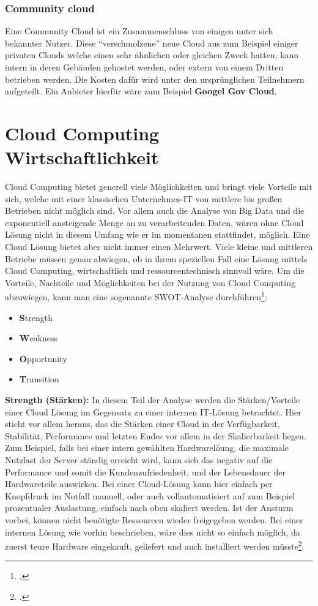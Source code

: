\subsubsection{Community cloud}
Eine Community Cloud ist ein Zusammenschluss von einigen unter sich bekannter Nutzer. Diese "`verschmolzene"' neue Cloud aus zum Beispiel einiger privaten Clouds welche einen sehr ähnlichen oder gleichen Zweck hatten, kann intern in deren Gebäuden gehostet werden, oder extern von einem Dritten betrieben werden. Die Kosten dafür wird unter den ursprünglichen Teilnehmern aufgeteilt.
Ein Anbieter hierfür wäre zum Beispiel \textbf{Googel Gov Cloud}.

\section{Cloud Computing Wirtschaftlichkeit}
Cloud Computing bietet generell viele Möglichkeiten und bringt viele Vorteile mit sich, welche mit einer klassischen Unternehmes-IT von mittlere bis großen Betrieben nicht möglich sind. Vor allem auch die Analyse von Big Data und die exponentiell ansteigende Menge an zu verarbeitenden Daten, wären ohne Cloud Lösung nicht in diesem Umfang wie er im momentanen stattfindet, möglich.
Eine Cloud Lösung bietet aber nicht immer einen Mehrwert. Viele kleine und mittleren Betriebe müssen genau abwiegen, ob in ihrem speziellen Fall eine Lösung mittels Cloud Computing, wirtschaftlich und ressourcentechnisch sinnvoll wäre.
Um die Vorteile, Nachteile und Möglichkeiten bei der Nutzung von Cloud Computing abzuwiegen, kann man eine sogenannte SWOT-Analyse
durchführen\footcite{Lehrunterlagen-HTL-cloud}:
\begin{itemize}
	\item \textbf{S}trength
	\item \textbf{W}eakness
	\item \textbf{O}pportunity
	\item \textbf{T}ransition
\end{itemize}

\textbf{Strength (Stärken):} In diesem Teil der Analyse werden die Stärken/Vorteile einer Cloud Lösung im Gegensatz zu einer internen
IT-Lösung betrachtet. Hier sticht vor allem heraus, das die Stärken einer Cloud in der Verfügbarkeit, Stabilität,
Performance und letzten Endes vor allem in der Skalierbarkeit liegen. Zum Beispiel, falls bei einer intern gewählten Hardwarelöung, die maximale Nutzlast der Server ständig erreicht wird, kann sich das negativ auf die Performance und somit die Kundenzufriedenheit, und der Lebensdauer der 
Hardwareteile auswirken. Bei einer Cloud-Lösung kann hier einfach per Knopfdruck im Notfall manuell, oder auch vollautomatisiert auf zum Beispiel prozentualer Auslastung, einfach nach oben skaliert werden. Ist der Ansturm vorbei, können nicht benötigte Ressourcen wieder freigegeben werden.
Bei einer internen Lösung wie vorhin beschrieben, wäre dies nicht so einfach möglich, da zuerst teure Hardware eingekauft,
geliefert und auch installiert werden müsste\footcite{Lehrunterlagen-HTL-cloud}.

